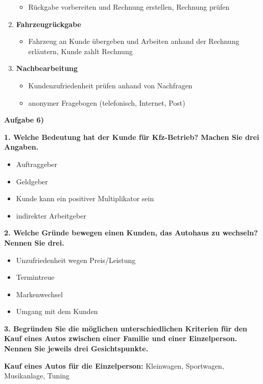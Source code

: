 \begin{enumerate}
  \begin{itemize}
  \item
    Rückgabe vorbereiten und Rechnung erstellen, Rechnung prüfen
  \end{itemize}
\item
  \textbf{Fahrzeugrückgabe}

  \begin{itemize}
  \item
    Fahrzeug an Kunde übergeben und Arbeiten anhand der Rechnung
    erläutern, Kunde zahlt Rechnung
  \end{itemize}
\item
  \textbf{Nachbearbeitung}

  \begin{itemize}
  \item
    Kundenzufriedenheit prüfen anhand von Nachfragen
  \item
    anonymer Fragebogen (telefonisch, Internet, Post)
  \end{itemize}
\end{enumerate}

\textbf{Aufgabe 6)}

\textbf{1. Welche Bedeutung hat der Kunde für Kfz-Betrieb? Machen Sie
drei Angaben.}

\begin{itemize}
\item
  Auftraggeber
\item
  Geldgeber
\item
  Kunde kann ein positiver Multiplikator sein
\item
  indirekter Arbeitgeber
\end{itemize}

\textbf{2. Welche Gründe bewegen einen Kunden, das Autohaus zu wechseln?
Nennen Sie drei.}

\begin{itemize}
\item
  Unzufriedenheit wegen Preis/Leistung
\item
  Termintreue
\item
  Markenwechsel
\item
  Umgang mit dem Kunden
\end{itemize}

\textbf{3. Begründen Sie die möglichen unterschiedlichen Kriterien für
den Kauf eines Autos zwischen einer Familie und einer Einzelperson.
Nennen Sie jeweils drei Gesichtspunkte.}

\textbf{Kauf eines Autos für die Einzelperson:} Kleinwagen, Sportwagen,
Musikanlage, Tuning

